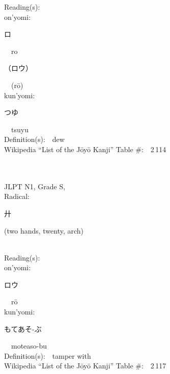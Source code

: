 \begin{multicols}{2}
Reading(s):\ \ \\
{\hspace*{1em}}on'yomi:\ \ \\
{\hspace*{2em}}{\begin{CJK}{UTF8}{min} ロ \end{CJK}}\ \ ro\ \ \\
{\hspace*{2em}}{\begin{CJK}{UTF8}{min} （ロウ） \end{CJK}}\ \ (r\=o)\ \ \\
{\hspace*{1em}}kun'yomi:\ \ \\
{\hspace*{2em}}{\begin{CJK}{UTF8}{min} つゆ \end{CJK}}\ \ tsuyu\ \ \\
Definition(s):\ \ dew \\
Wikipedia ``List of the J\=oy\=o Kanji'' Table \#:\ \ 2\,114 \\
\ \ \\
{\fontsize{34pt}{40pt}  }\ \ \\
{JLPT N1, Grade S, \\Radical:\ \ {\begin{CJK}{UTF8}{min} 廾 \end{CJK}} (two hands, twenty, arch) } \\
Reading(s):\ \ \\
{\hspace*{1em}}on'yomi:\ \ \\
{\hspace*{2em}}{\begin{CJK}{UTF8}{min} ロウ \end{CJK}}\ \ r\=o\ \ \\
{\hspace*{1em}}kun'yomi:\ \ \\
{\hspace*{2em}}{\begin{CJK}{UTF8}{min} もてあそ-ぶ \end{CJK}}\ \ moteaso-bu\ \ \\
Definition(s):\ \ tamper with \\
Wikipedia ``List of the J\=oy\=o Kanji'' Table \#:\ \ 2\,117 \\
\ \ \\

\end{multicols}
